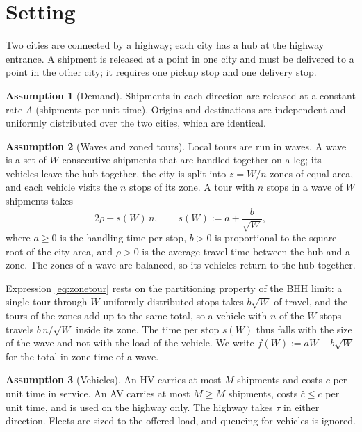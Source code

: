 \documentclass[10pt, reqno]{amsart}
\theoremstyle{definition}
\newtheorem{assumption}{Assumption}
\begin{document}
\section{Setting}

Two cities are connected by a highway; each city has a hub at the highway entrance. A shipment is released at a point in one city and must be delivered to a point in the other city; it requires one pickup stop and one delivery stop.

\begin{assumption}[Demand]\label{as:demand}
Shipments in each direction are released at a constant rate $\Lambda$ (shipments per unit time). Origins and destinations are independent and uniformly distributed over the two cities, which are identical.
\end{assumption}

\begin{assumption}[Waves and zoned tours]\label{as:bhh}
Local tours are run in waves. A wave is a set of $W$ consecutive shipments that are handled together on a leg; its vehicles leave the hub together, the city is split into $z=W/n$ zones of equal area, and each vehicle visits the $n$ stops of its zone. A tour with $n$ stops in a wave of $W$ shipments takes
\begin{equation}\label{eq:zonetour}
2\rho+s(W)\,n,\qquad s(W):=a+\frac{b}{\sqrt W},
\end{equation}
where $a\ge0$ is the handling time per stop, $b>0$ is proportional to the square root of the city area, and $\rho>0$ is the average travel time between the hub and a zone. The zones of a wave are balanced, so its vehicles return to the hub together.
\end{assumption}

Expression \eqref{eq:zonetour} rests on the partitioning property of the BHH limit: a single tour through $W$ uniformly distributed stops takes $b\sqrt W$ of travel, and the tours of the zones add up to the same total, so a vehicle with $n$ of the $W$ stops travels $b\,n/\sqrt W$ inside its zone. The time per stop $s(W)$ thus falls with the size of the wave and not with the load of the vehicle. We write $f(W):=aW+b\sqrt W$ for the total in-zone time of a wave.

\begin{assumption}[Vehicles]\label{as:veh}
An HV carries at most $M$ shipments and costs $c$ per unit time in service. An AV carries at most $\hat M\ge M$ shipments, costs $\hat c\le c$ per unit time, and is used on the highway only. The highway takes $\tau$ in either direction. Fleets are sized to the offered load, and queueing for vehicles is ignored.
\end{assumption}
\end{document}
